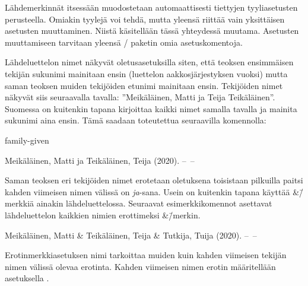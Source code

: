 \begin{koodilohkosis}
\renewcommand{\bibfont}{\sffamily\small}
\end{koodilohkosis}

Lähdemerkinnät itsessään muodostetaan automaattisesti tiettyjen
tyyliasetusten perusteella. Omiakin tyylejä voi tehdä, mutta yleensä
riittää vain yksittäisen asetusten muuttaminen. Niistä käsitellään tässä
yhteydessä muutama. Asetusten muuttamiseen tarvitaan yleensä
\-/ paketin omia asetuskomentoja.

Lähdeluettelon nimet näkyvät oletusasetuksilla siten, että teoksen
ensimmäisen tekijän sukunimi mainitaan ensin (luettelon
aakkosjärjestyksen vuoksi) mutta saman teoksen muiden tekijöiden etunimi
mainitaan ensin. Tekijöiden nimet näkyvät siis seuraavalla tavalla:
''Meikäläinen, Matti ja Teija Teikäläinen''. Suomessa on kuitenkin
tapana kirjoittaa kaikki nimet samalla tavalla ja mainita sukunimi aina
ensin. Tämä saadaan toteutettua seuraavilla komennolla:

\begin{koodilohkosis}
 {family-given}
\end{koodilohkosis}

\begin{tulossis}
  Meikäläinen, Matti ja Teikäläinen, Teija (2020). --~--
\end{tulossis}

Saman teoksen eri tekijöiden nimet erotetaan oletuksena toisistaan
pilkuilla paitsi kahden viimeisen nimen välissä on \textit{ja}-sana.
Usein on kuitenkin tapana käyttää \&\=/merkkiä ainakin lähdeluettelossa.
Seuraavat esimerkkikomennot asettavat lähdeluettelon kaikkien nimien
erottimeksi \&\=/merkin.

\begin{koodilohkosis}
\end{koodilohkosis}

\begin{tulossis}
  Meikäläinen, Matti \& Teikäläinen, Teija \& Tutkija, Tuija (2020).
  --~--
\end{tulossis}

Erotinmerkkiasetuksen nimi  tarkoittaa muiden
kuin kahden viimeisen tekijän nimen välissä olevaa erotinta. Kahden
viimeisen nimen erotin määritellään asetuksella
.

